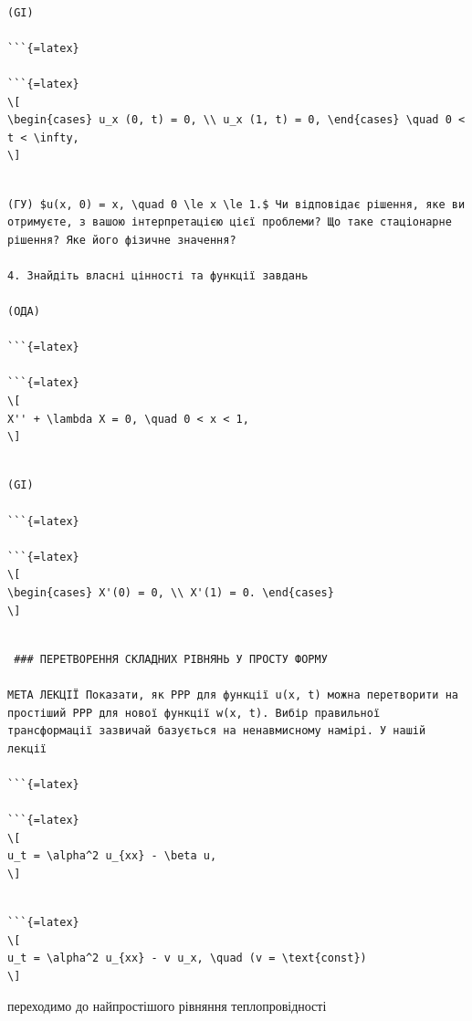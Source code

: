 \documentclass[
]{article}
\begin{document}
\begin{verbatim}

(GI)

```{=latex}

```{=latex}
\[
\begin{cases} u_x (0, t) = 0, \\ u_x (1, t) = 0, \end{cases} \quad 0 < t < \infty,
\]
\end{verbatim}

\begin{verbatim}

(ГУ) $u(x, 0) = x, \quad 0 \le x \le 1.$ Чи відповідає рішення, яке ви отримуєте, з вашою інтерпретацією цієї проблеми? Що таке стаціонарне рішення? Яке його фізичне значення?

4. Знайдіть власні цінності та функції завдань

(ОДА)

```{=latex}

```{=latex}
\[
X'' + \lambda X = 0, \quad 0 < x < 1,
\]
\end{verbatim}

\begin{verbatim}

(GI) 

```{=latex}

```{=latex}
\[
\begin{cases} X'(0) = 0, \\ X'(1) = 0. \end{cases}
\]
\end{verbatim}

\begin{verbatim}

 ### ПЕРЕТВОРЕННЯ СКЛАДНИХ РІВНЯНЬ У ПРОСТУ ФОРМУ

МЕТА ЛЕКЦІЇ Показати, як PPP для функції u(x, t) можна перетворити на простіший PPP для нової функції w(x, t). Вибір правильної трансформації зазвичай базується на ненавмисному намірі. У нашій лекції

```{=latex}

```{=latex}
\[
u_t = \alpha^2 u_{xx} - \beta u,
\]
\end{verbatim}

\begin{verbatim}

```{=latex}
\[
u_t = \alpha^2 u_{xx} - v u_x, \quad (v = \text{const})
\]
\end{verbatim}

переходимо до найпростішого рівняння теплопровідності
\end{document}
